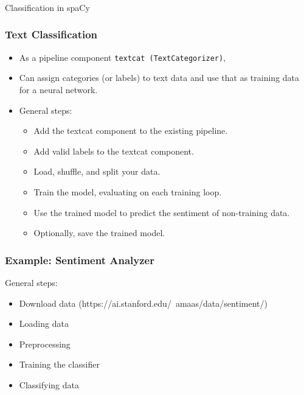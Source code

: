 \begin{frame}[fragile]\frametitle{}

\begin{center}
{\Large Classification in spaCy}
\end{center}
\end{frame}

\begin{frame}[fragile]\frametitle{Text Classification}


\begin{itemize}
\item As a pipeline component \lstinline|textcat (TextCategorizer)|, 
\item Can assign categories (or labels) to text data and use that as training data for a neural network.
\item General steps:
\begin{itemize}
\item Add the textcat component to the existing pipeline.
\item Add valid labels to the textcat component.
\item Load, shuffle, and split your data.
\item Train the model, evaluating on each training loop.
\item Use the trained model to predict the sentiment of non-training data.
\item Optionally, save the trained model.
  \end{itemize}

  \end{itemize}

\end{frame}

\begin{frame}[fragile]\frametitle{Example: Sentiment Analyzer}


General steps:
\begin{itemize}
\item Download data (https://ai.stanford.edu/~amaas/data/sentiment/)
\item Loading data
\item Preprocessing
\item Training the classifier
\item Classifying data
\end{itemize}


\end{frame}


